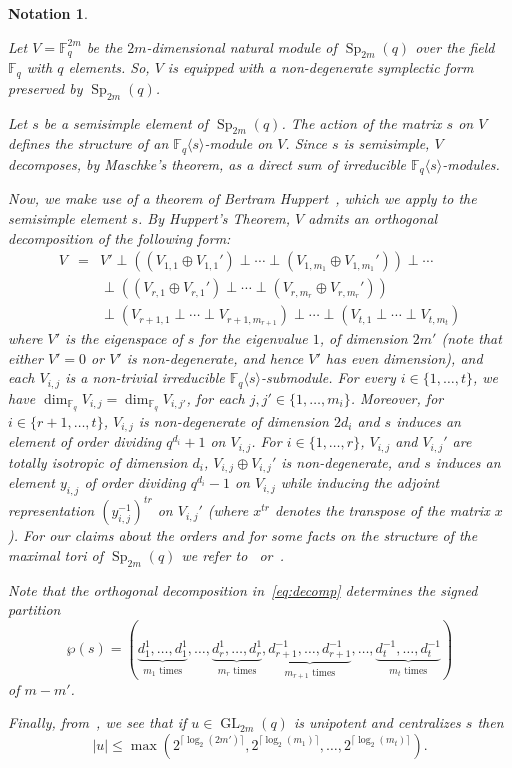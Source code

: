 \documentclass{amsart}
\newtheorem{notation}[theorem]{Notation}
\begin{document}
\begin{notation}\label{not1}{\rm 
Let $V=\mathbb{F}_q^{2m}$ be the $2m$-dimensional natural module of ${\mathop{\mathrm{Sp}}}_{2m}(q)$ over the field $\mathbb{F}_q$ with $q$ elements. So, $V$ is equipped with a non-degenerate symplectic form preserved by ${\mathop{\mathrm{Sp}}}_{2m}(q)$. 

Let $s$ be a semisimple element of ${\mathop{\mathrm{Sp}}}_{2m}(q)$. The action of the matrix 
$s$ on $V$ defines the structure of an $\mathbb{F}_{q}\langle s\rangle$-module on $V$.  
Since $s$ is semisimple, $V$ decomposes, by Maschke's theorem, as a direct 
sum of irreducible $\mathbb{F}_{q}\langle s\rangle$-modules.

Now, we make use of a theorem of 
Bertram Huppert~\cite[Satz 2]{H}, which we apply to the semisimple element $s$. By Huppert's Theorem, $V$ 
admits an orthogonal decomposition of the following form: 
\begin{eqnarray}\label{eq:decomp}
V&=&V'\perp ((V_{1,1}\oplus V_{1,1}')\perp \cdots \perp (V_{1,m_1}\oplus V_{1,m_1}'))\perp \cdots \\
&&\perp ((V_{r,1}\oplus V_{r,1}')\perp \cdots \perp (V_{r,m_r}\oplus V_{r,m_r}'))\nonumber\\
&&\perp (V_{r+1,1}\perp \cdots \perp V_{r+1,m_{r+1}})
\perp\cdots \perp (V_{t,1}\perp \cdots \perp V_{t,m_{t}}) \nonumber
\end{eqnarray}
where $V'$ is the  eigenspace of $s$ for the eigenvalue
$1$, of dimension $2m'$ (note that either $V'=0$ or $V'$ is non-degenerate, and hence $V'$ has even dimension),
and each  $V_{i,j}$ is a non-trivial irreducible $\mathbb{F}_{q}\langle s\rangle$-submodule. For every $i\in \{1,\ldots,t\}$, we have $\dim_{\mathbb{F}_q}V_{i,j}=\dim_{\mathbb{F}_q}V_{i,j'}$, for each $j,j'\in \{1,\ldots,m_i\}$.
Moreover, for $i\in \{r+1,\ldots,t\}$, $V_{i,j}$ is non-degenerate of dimension $2d_i$  and $s$ 
induces an element of order dividing $q^{d_i}+1$ on $V_{i,j}$. 
For $i\in\{1,\ldots,r\}$, $V_{i,j}$ and $V_{i,j}'$ are totally isotropic  of dimension $d_i$, 
$V_{i,j}\oplus V_{i,j}'$ is non-degenerate, and $s$ 
induces an element $y_{i,j}$ of order dividing $q^{d_i}-1$ on $V_{i,j}$ while
inducing the adjoint representation $(y_{i,j}^{-1})^{tr}$ on  $V_{i,j}'$ (where 
$x^{tr}$ denotes the transpose of the matrix $x$). For our claims about the 
orders and
for some facts on the structure of the maximal tori of ${\mathop{\mathrm{Sp}}}_{2m}(q)$  we refer to~\cite{BC,KS} or~\cite[Section~$2$]{DGPS}.  

Note that the orthogonal decomposition in~\eqref{eq:decomp} determines the signed partition  
\[ 
\wp(s)=(\underbrace{d_1^{1},\ldots,d_1^{1}}_{m_1\textrm{ times}},\ldots,\underbrace{d_r^{1},\ldots,d_r^{1}}_{m_r\textrm{ times}},
\underbrace{d_{r+1}^{-1},\ldots,d_{r+1}^{-1}}_{m_{r+1}\textrm{ times}},\ldots,\underbrace{d_t^{-1},\ldots,d_t^{-1}}_{m_t\textrm{ times}}) 
\]
of $m-m'$. 

Finally, from~\cite[Proposition~$2.6$]{DGPS}, we see that if $u\in {\mathop{\textrm{GL}}}_{2m}(q)$  is  unipotent and centralizes $s$ then
$$|u|\leq \max( 
2^{\lceil \log_2(2{m'})\rceil},2^{\lceil \log_2({m_1})\rceil},\ldots,2^{\lceil \log_2({m_t})\rceil}
).$$
}
\end{notation}
\end{document}
